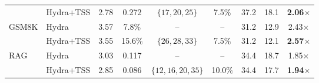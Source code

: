 \begin{table}[t]
\begin{tabular}{llccccccc}
 & Hydra+TSS & 2.78 & 0.272 & $\{17,20,25\}$ & 7.5\% & 37.2 & 18.1 & \textbf{2.06$\times$} \\
GSM8K & Hydra & 3.57 & 7.8\% & -- & -- & 31.2 & 12.9 & 2.43$\times$ \\
 & Hydra+TSS & 3.55 & 15.6\% & $\{26,28,33\}$ & 7.5\% & 31.2 & 12.1 & \textbf{2.57$\times$} \\
RAG & Hydra & 3.03 & 0.117 & -- & -- & 34.4 & 18.7 & 1.85$\times$ \\
 & Hydra+TSS & 2.85 & 0.086 & $\{12,16,20,35\}$ & 10.0\% & 34.4 & 17.7 & \textbf{1.94$\times$} \\
\bottomrule
\end{tabular}
\end{table}
